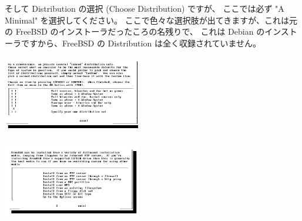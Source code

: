 \documentclass[mingoth,a4paper]{jsarticle}
\begin{document}
そして Distribution の選択 (Choose Distribution) ですが、
ここでは必ず "A Minimal" を選択してください。
ここで色々な選択肢が出てきますが、これは元の FreeBSD のインストーラだったころの名残りで、
これは Debian のインストーラですから、FreeBSD の Distribution は全く収録されていません。

\begin{minipage}{0.4\hsize}
\includegraphics[width=6cm]{image200906/kfreebsd06_mono.png}
\end{minipage}
\begin{minipage}{0.4\hsize}
\includegraphics[width=6cm]{image200906/kfreebsd07_mono.png}
\end{minipage}
\end{document}

